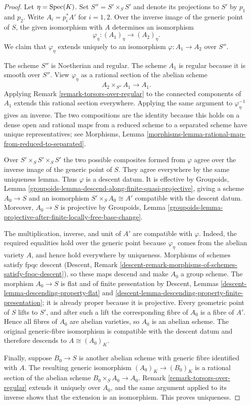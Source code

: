 \begin{proof}
Let $\eta = \mathop{\mathrm{Spec}}(K)$. Set $S'' = S' \times_S S'$ and denote its
projections to $S'$ by
$p_1$ and $p_2$. Write $A_i = p_i^*A'$ for $i = 1, 2$.
Over the inverse image of the generic point of $S$, the given isomorphism
with $A$ determines an isomorphism
$$
\varphi_\eta : (A_1)_\eta \longrightarrow (A_2)_\eta.
$$
We claim that $\varphi_\eta$ extends uniquely to an isomorphism
$\varphi : A_1 \to A_2$ over $S''$.

The scheme $S''$ is Noetherian and regular. The scheme $A_1$ is regular
because it is smooth over $S''$. View $\varphi_\eta$ as a rational section
of the abelian scheme
$$
A_2 \times_{S''} A_1 \longrightarrow A_1.
$$
Applying Remark \ref{remark-torsors-over-regular} to the connected
components of $A_1$ extends this rational section everywhere. Applying the
same argument to $\varphi_\eta^{-1}$ gives an inverse. The two compositions
are the identity because this holds on a dense open and rational maps from
a reduced scheme to a separated scheme have unique representatives; see
Morphisms, Lemma
\ref{morphisms-lemma-rational-map-from-reduced-to-separated}.

Over $S' \times_S S' \times_S S'$ the two possible composites formed from
$\varphi$ agree over the inverse image of the generic point of $S$. They
agree everywhere by the same uniqueness lemma. Thus $\varphi$ is a descent
datum. It is effective by Groupoids, Lemma
\ref{groupoids-lemma-descend-along-finite-quasi-projective}, giving a scheme
$A_0 \to S$ and an isomorphism $S' \times_S A_0 \cong A'$ compatible with
the descent datum. Moreover, $A_0 \to S$ is projective by Groupoids, Lemma
\ref{groupoids-lemma-projective-after-finite-locally-free-base-change}.

The multiplication, inverse, and unit of $A'$ are compatible with
$\varphi$. Indeed, the required equalities hold over the generic point
because $\varphi_\eta$ comes from the abelian variety $A$, and hence hold
everywhere by uniqueness. Morphisms of schemes satisfy fpqc descent
(Descent, Remark
\ref{descent-remark-morphisms-of-schemes-satisfy-fpqc-descent}), so these
maps descend and make $A_0$ a group scheme. The morphism $A_0 \to S$ is
flat and of finite presentation by Descent, Lemmas
\ref{descent-lemma-descending-property-flat} and
\ref{descent-lemma-descending-property-finite-presentation}; it is already
proper because it is projective. Every geometric point of $S$ lifts to
$S'$, and after such a lift the corresponding fibre of $A_0$ is a fibre of
$A'$. Hence all fibres of $A_0$ are abelian varieties, so $A_0$ is an
abelian scheme. The original generic-fibre isomorphism is compatible with
the descent datum and therefore descends to $A \cong (A_0)_K$.

Finally, suppose $B_0 \to S$ is another abelian scheme with generic fibre
identified with $A$. The resulting generic isomorphism
$(A_0)_K \to (B_0)_K$ is a rational section of the abelian scheme
$B_0 \times_S A_0 \to A_0$. Remark
\ref{remark-torsors-over-regular} extends it uniquely over $A_0$, and the
same argument applied to its inverse shows that the extension is an
isomorphism. This proves uniqueness.
\end{proof}

